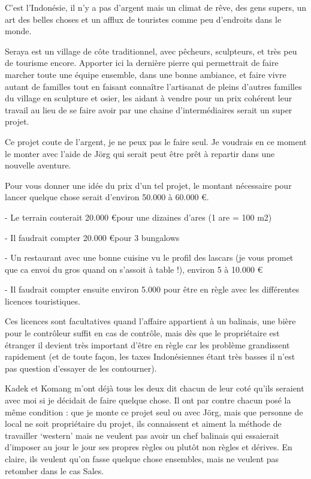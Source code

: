\par
C’est l’Indonésie, il n’y a pas d’argent mais un climat de rêve, des gens supers, un art des belles choses et un afflux de touristes comme peu d’endroits dans le monde.

\par
Seraya est un village de côte traditionnel, avec pêcheurs, sculpteurs, et très peu de tourisme encore. Apporter ici la dernière pierre qui permettrait de faire marcher toute une équipe ensemble, dans une bonne ambiance, et faire vivre autant de familles tout en faisant connaître l’artisanat de pleins d’autres familles du village en sculpture et osier, les aidant à vendre pour un prix cohérent leur travail au lieu de se faire avoir par une chaine d’intermédiaires serait un super projet.

\par
Ce projet coute de l’argent, je ne peux pas le faire seul. Je voudrais en ce moment le monter avec l’aide de Jörg qui serait peut être prêt à repartir dans une nouvelle aventure.

\par
Pour vous donner une idée du prix d’un tel projet, le montant nécessaire pour lancer quelque chose serait d’environ 50.000 à 60.000 \euro.

\par
- Le terrain couterait 20.000 \euro pour une dizaines d’ares (1 are = 100 m2)

\par
- Il faudrait compter 20.000 \euro pour 3 bungalows

\par
- Un restaurant avec une bonne cuisine vu le profil des lascars (je vous promet que ca envoi du gros quand on s’assoit à table !), environ 5 à 10.000 \euro

\par
- Il faudrait compter ensuite environ 5.000 pour être en règle avec les différentes licences touristiques.

\par
Ces licences sont facultatives quand l’affaire appartient à un balinais, une bière pour le contrôleur suffit en cas de contrôle, mais dès que le propriétaire est étranger il devient très important d’être en règle car les problème grandissent rapidement (et de toute façon, les taxes Indonésiennes étant très basses il n’est pas question d’essayer de les contourner).

\par
Kadek et Komang m’ont déjà tous les deux dit chacun de leur coté qu’ils seraient avec moi si je décidait de faire quelque chose. Il ont par contre chacun posé la même condition : que je monte ce projet seul ou avec Jörg, mais que personne de local ne soit propriétaire du projet, ils connaissent et aiment la méthode de travailler ‘western’ mais ne veulent pas avoir un chef balinais qui essaierait d’imposer au jour le jour ses propres règles ou plutôt non règles et dérives. En claire, ils veulent qu’on fasse quelque chose ensembles, mais ne veulent pas retomber dans le cas Sales.

